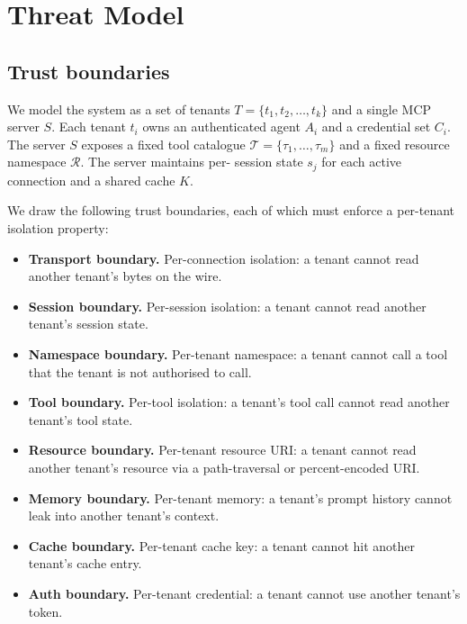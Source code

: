 \documentclass[sigconf, anonymous, natbib=false]{acmart}
\begin{document}
\section{Threat Model}\label{sec:threat}

\subsection{Trust boundaries}

We model the system as a set of tenants $T = \{t_1, t_2,
\ldots, t_k\}$ and a single MCP server $S$. Each tenant $t_i$
owns an authenticated agent $A_i$ and a credential set
$C_i$. The server $S$ exposes a fixed tool catalogue
$\mathcal{T} = \{\tau_1, \ldots, \tau_m\}$ and a fixed
resource namespace $\mathcal{R}$. The server maintains per-
session state $s_j$ for each active connection and a shared
cache $K$.

We draw the following trust boundaries, each of which must
enforce a per-tenant isolation property:

\begin{itemize}
  \item \textbf{Transport boundary.} Per-connection
        isolation: a tenant cannot read another tenant's
        bytes on the wire.
  \item \textbf{Session boundary.} Per-session isolation:
        a tenant cannot read another tenant's session
        state.
  \item \textbf{Namespace boundary.} Per-tenant
        namespace: a tenant cannot call a tool that the
        tenant is not authorised to call.
  \item \textbf{Tool boundary.} Per-tool isolation: a
        tenant's tool call cannot read another tenant's
        tool state.
  \item \textbf{Resource boundary.} Per-tenant resource
        URI: a tenant cannot read another tenant's resource
        via a path-traversal or percent-encoded URI.
  \item \textbf{Memory boundary.} Per-tenant memory: a
        tenant's prompt history cannot leak into another
        tenant's context.
  \item \textbf{Cache boundary.} Per-tenant cache key: a
        tenant cannot hit another tenant's cache entry.
  \item \textbf{Auth boundary.} Per-tenant credential: a
        tenant cannot use another tenant's token.
\end{itemize}
\end{document}

